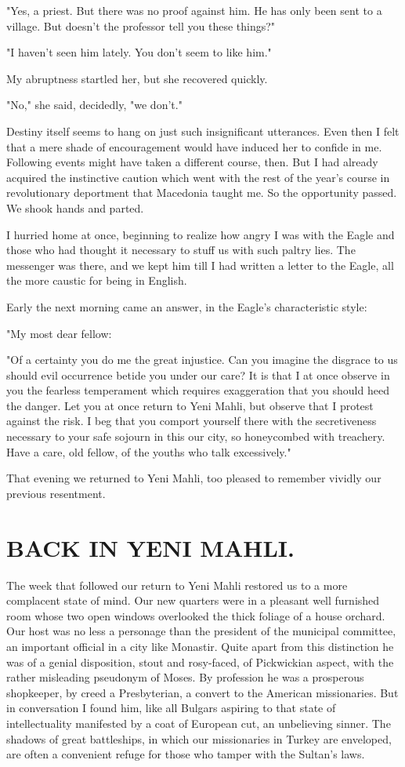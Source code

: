 \documentclass[a5paper,12pt]{book}
\begin{document}
"Yes, a priest. But there was no proof against him. He has only been sent to a village. But doesn’t the professor tell you these things?"

"I haven’t seen him lately. You don’t seem to like him."

My abruptness startled her, but she recovered quickly.

"No," she said, decidedly, "we don’t."

Destiny itself seems to hang on just such insignificant utterances. Even then I felt that a mere shade of encouragement would have induced her to confide in me. Following events might have taken a different course, then. But I had already acquired the instinctive caution which went with the rest of the year's course in revolutionary deportment that Macedonia taught me. So the opportunity passed. We shook hands and parted.

I hurried home at once, beginning to realize how angry I was with the Eagle and those who had thought it necessary to stuff us with such paltry lies. The messenger was there, and we kept him till I had written a letter to the Eagle, all the more caustic for being in English.

Early the next morning came an answer, in the Eagle's characteristic style:

"My most dear fellow:

"Of a certainty you do me the great injustice. Can you imagine the disgrace to us should evil occurrence betide you under our care? It is that I at once observe in you the fearless temperament which requires exaggeration that you should heed the danger. Let you at once return to Yeni Mahli, but observe that I protest against the risk. I beg that you comport yourself there with the secretiveness necessary to your safe sojourn in this our city, so honeycombed with treachery. Have a care, old fellow, of the youths who talk excessively."

That evening we returned to Yeni Mahli, too pleased to remember vividly our previous resentment.


\chapter{BACK IN YENI MAHLI.}

The week that followed our return to Yeni Mahli restored us to a more complacent state of mind. Our new quarters were in a pleasant well furnished room whose two open windows overlooked the thick foliage of a house orchard. Our host was no less a personage than the president of the municipal committee, an important official in a city like Monastir. Quite apart from this distinction he was of a genial disposition, stout and rosy-faced, of Pickwickian aspect, with the rather misleading pseudonym of Moses. By profession he was a prosperous shopkeeper, by creed a Presbyterian, a convert to the American missionaries. But in conversation I found him, like all Bulgars aspiring to that state of intellectuality manifested by a coat of European cut, an unbelieving sinner. The shadows of great battleships, in which our missionaries in Turkey are enveloped, are often a convenient refuge for those who tamper with the Sultan’s laws.
\end{document}
